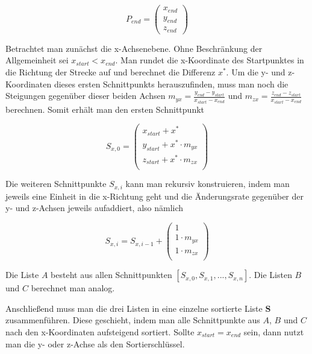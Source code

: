 \documentclass[]{dsadokumentation}
\begin{document}
\begin{equation}
  P_{end} = \begin{pmatrix}x_{end} \\ y_{end} \\ z_{end}\end{pmatrix}
\end{equation}

Betrachtet man zunächst die x-Achsenebene. Ohne Beschränkung der Allgemeinheit sei $x_{start} < x_{end}$. Man rundet die x-Koordinate des Startpunktes in die Richtung der Strecke auf und berechnet die Differenz $x^{\ast}$. Um die y- und z-Koordinaten dieses ersten Schnittpunkts herauszufinden, muss man noch die Steigungen gegenüber dieser beiden Achsen $m_{yx} = \frac{y_{end} - y_{start}}{x_{start} - x_{end}}$ und $m_{zx} = \frac{z_{end} - z_{start}}{x_{start} - x_{end}}$ berechnen. Somit erhält man den ersten Schnittpunkt

\begin{equation}
  S_{x,0} = \begin{pmatrix}
    x_{start} + x^{\ast} \\
    y_{start} + x^{\ast} \cdot m_{yx} \\
    z_{start} + x^{\ast} \cdot m_{zx} \\
  \end{pmatrix}
\end{equation}

Die weiteren Schnittpunkte $S_{x,i}$ kann man rekursiv konstruieren, indem man jeweils eine Einheit in die x-Richtung geht und die Änderungsrate gegenüber der y- und z-Achsen jeweils aufaddiert, also nämlich

\begin{equation}
  S_{x,i} = S_{x,i-1} + \begin{pmatrix}
    1 \\
    1 \cdot m_{yx} \\
    1 \cdot m_{zx} \\
  \end{pmatrix}
\end{equation}

 Die Liste $A$ besteht aus allen Schnittpunkten $[S_{x,0}, S_{x,1}, ..., S_{x,n}]$. Die Listen $B$ und $C$ berechnet man analog.

Anschließend muss man die drei Listen in eine einzelne sortierte Liste $\mathbf{S}$ zusammenführen. Diese geschieht, indem man alle Schnittpunkte aus $A$, $B$ und $C$ nach den x-Koordinaten aufsteigend sortiert. Sollte $x_{start} = x_{end}$ sein, dann nutzt man die y- oder z-Achse als den Sortierschlüssel.
\end{document}

